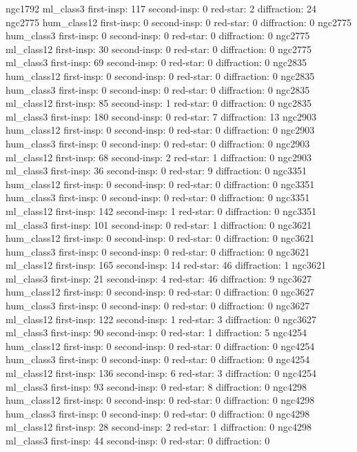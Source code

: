 ngc1792 ml_class3 first-insp: 117 second-insp:  0 red-star:  2 diffraction:  24
ngc2775 hum_class12 first-insp: 0 second-insp:  0 red-star:  0 diffraction:  0
ngc2775 hum_class3 first-insp: 0 second-insp:  0 red-star:  0 diffraction:  0
ngc2775 ml_class12 first-insp: 30 second-insp:  0 red-star:  0 diffraction:  0
ngc2775 ml_class3 first-insp: 69 second-insp:  0 red-star:  0 diffraction:  0
ngc2835 hum_class12 first-insp: 0 second-insp:  0 red-star:  0 diffraction:  0
ngc2835 hum_class3 first-insp: 0 second-insp:  0 red-star:  0 diffraction:  0
ngc2835 ml_class12 first-insp: 85 second-insp:  1 red-star:  0 diffraction:  0
ngc2835 ml_class3 first-insp: 180 second-insp:  0 red-star:  7 diffraction:  13
ngc2903 hum_class12 first-insp: 0 second-insp:  0 red-star:  0 diffraction:  0
ngc2903 hum_class3 first-insp: 0 second-insp:  0 red-star:  0 diffraction:  0
ngc2903 ml_class12 first-insp: 68 second-insp:  2 red-star:  1 diffraction:  0
ngc2903 ml_class3 first-insp: 36 second-insp:  0 red-star:  9 diffraction:  0
ngc3351 hum_class12 first-insp: 0 second-insp:  0 red-star:  0 diffraction:  0
ngc3351 hum_class3 first-insp: 0 second-insp:  0 red-star:  0 diffraction:  0
ngc3351 ml_class12 first-insp: 142 second-insp:  1 red-star:  0 diffraction:  0
ngc3351 ml_class3 first-insp: 101 second-insp:  0 red-star:  1 diffraction:  0
ngc3621 hum_class12 first-insp: 0 second-insp:  0 red-star:  0 diffraction:  0
ngc3621 hum_class3 first-insp: 0 second-insp:  0 red-star:  0 diffraction:  0
ngc3621 ml_class12 first-insp: 165 second-insp:  14 red-star:  46 diffraction:  1
ngc3621 ml_class3 first-insp: 21 second-insp:  4 red-star:  46 diffraction:  9
ngc3627 hum_class12 first-insp: 0 second-insp:  0 red-star:  0 diffraction:  0
ngc3627 hum_class3 first-insp: 0 second-insp:  0 red-star:  0 diffraction:  0
ngc3627 ml_class12 first-insp: 122 second-insp:  1 red-star:  3 diffraction:  0
ngc3627 ml_class3 first-insp: 90 second-insp:  0 red-star:  1 diffraction:  5
ngc4254 hum_class12 first-insp: 0 second-insp:  0 red-star:  0 diffraction:  0
ngc4254 hum_class3 first-insp: 0 second-insp:  0 red-star:  0 diffraction:  0
ngc4254 ml_class12 first-insp: 136 second-insp:  6 red-star:  3 diffraction:  0
ngc4254 ml_class3 first-insp: 93 second-insp:  0 red-star:  8 diffraction:  0
ngc4298 hum_class12 first-insp: 0 second-insp:  0 red-star:  0 diffraction:  0
ngc4298 hum_class3 first-insp: 0 second-insp:  0 red-star:  0 diffraction:  0
ngc4298 ml_class12 first-insp: 28 second-insp:  2 red-star:  1 diffraction:  0
ngc4298 ml_class3 first-insp: 44 second-insp:  0 red-star:  0 diffraction:  0
